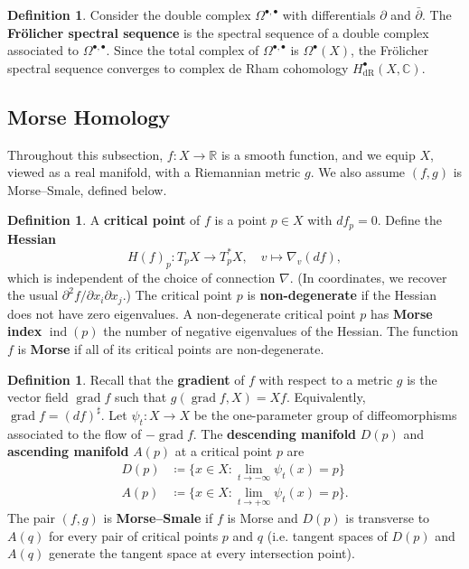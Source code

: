 \documentclass{report}
\theoremstyle{plain}
\theoremstyle{definition}
\newtheorem{definition}[theorem]{Definition}
\theoremstyle{remark}
\newcommand{\di}{\partial}
\newcommand{\bC}{\mathbb{C}}
\newcommand{\bR}{\mathbb{R}}
\DeclareMathOperator{\grad}{grad}
\DeclareMathOperator{\ind}{ind}
\newcommand{\dR}{\mathrm{dR}}
\newcommand{\bdi}{\bar{\di}}
\begin{document}
\begin{definition}
  Consider the double complex $\Omega^{\bullet,\bullet}$ with
  differentials $\di$ and $\bdi$. The {\bf Fr\"olicher spectral
    sequence} is the spectral sequence of a double complex associated
  to $\Omega^{\bullet,\bullet}$. Since the total complex of
  $\Omega^{\bullet,\bullet}$ is $\Omega^\bullet(X)$, the Fr\"olicher
  spectral sequence converges to complex de Rham cohomology
  $H^\bullet_{\dR}(X, \bC)$.
\end{definition}

\subsection{Morse Homology}

Throughout this subsection, $f\colon X \to \bR$ is a smooth function,
and we equip $X$, viewed as a real manifold, with a Riemannian metric
$g$. We also assume $(f, g)$ is Morse--Smale, defined below.

\begin{definition}
  A {\bf critical point} of $f$ is a point $p \in X$ with $df_p = 0$.
  Define the {\bf Hessian}
  \[ H(f)_p\colon T_pX \to T_p^*X, \quad v \mapsto \nabla_v(df), \]
  which is independent of the choice of connection $\nabla$. (In
  coordinates, we recover the usual $\di^2f/\di x_i \di x_j$.) The
  critical point $p$ is {\bf non-degenerate} if the Hessian does not
  have zero eigenvalues. A non-degenerate critical point $p$ has {\bf
    Morse index} $\ind(p)$ the number of negative eigenvalues of the
  Hessian. The function $f$ is {\bf Morse} if all of its critical
  points are non-degenerate.
\end{definition}

\begin{definition} \label{def:morse-smale}
  Recall that the {\bf gradient} of $f$ with respect to a metric $g$
  is the vector field $\grad f$ such that $g(\grad f, X) = Xf$.
  Equivalently, $\grad f = (df)^\sharp$. Let $\psi_t\colon X \to X$ be
  the one-parameter group of diffeomorphisms associated to the flow of
  $-\grad f$. The {\bf descending manifold} $D(p)$ and {\bf ascending
    manifold} $A(p)$ at a critical point $p$ are
  \begin{align*}
    D(p) &\coloneqq \{x \in X : \lim_{t \to -\infty} \psi_t(x) = p\} \\
    A(p) &\coloneqq \{x \in X : \lim_{t \to +\infty} \psi_t(x) = p\}.
  \end{align*}
  The pair $(f, g)$ is {\bf Morse--Smale} if $f$ is Morse and $D(p)$
  is transverse to $A(q)$ for every pair of critical points $p$ and
  $q$ (i.e. tangent spaces of $D(p)$ and $A(q)$ generate the tangent
  space at every intersection point).
\end{definition}
\end{document}
